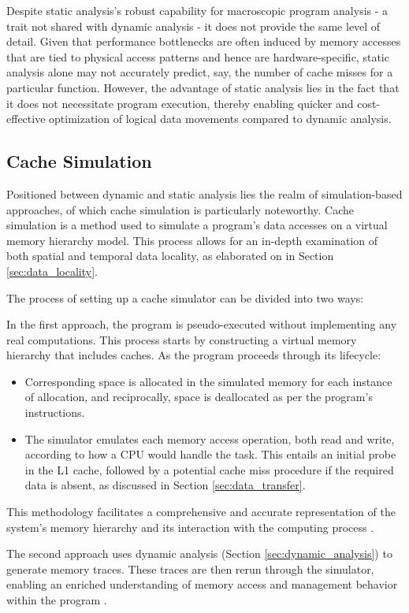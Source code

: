 Despite static analysis's robust capability for macroscopic program analysis - a trait not shared with dynamic analysis - it does not provide the same level of detail. Given that performance bottlenecks are often induced by memory accesses that are tied to physical access patterns and hence are hardware-specific, static analysis alone may not accurately predict, say, the number of cache misses for a particular function. However, the advantage of static analysis lies in the fact that it does not necessitate program execution, thereby enabling quicker and cost-effective optimization of logical data movements compared to dynamic analysis.

\subsection{Cache Simulation}\label{sec:simulation}
Positioned between dynamic and static analysis lies the realm of simulation-based approaches, of which cache simulation is particularly noteworthy. Cache simulation is a method used to simulate a program's data accesses on a virtual memory hierarchy model. This process allows for an in-depth examination of both spatial and temporal data locality, as elaborated on in Section \ref{sec:data_locality}.

The process of setting up a cache simulator can be divided into two ways:

In the first approach, the program is pseudo-executed without implementing any real computations. This process starts by constructing a virtual memory hierarchy that includes caches. As the program proceeds through its lifecycle:
\begin{itemize}
	\item Corresponding space is allocated in the simulated memory for each instance of allocation, and reciprocally, space is deallocated as per the program's instructions.
	\item The simulator emulates each memory access operation, both read and write, according to how a CPU would handle the task. This entails an initial probe in the L1 cache, followed by a potential cache miss procedure if the required data is absent, as discussed in Section \ref{sec:data_transfer}.
\end{itemize}
This methodology facilitates a comprehensive and accurate representation of the system's memory hierarchy and its interaction with the computing process \cite{schaad2022boosting,hammer2017kerncraft}.

The second approach uses dynamic analysis (Section \ref{sec:dynamic_analysis}) to generate memory traces. These traces are then rerun through the simulator, enabling an enriched understanding of memory access and management behavior within the program \cite{choudhury2011abstract}.

